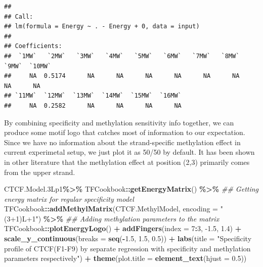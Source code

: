 \documentclass[
]{article}
\newenvironment{Shaded}{\begin{snugshade}}{\end{snugshade}}
\newcommand{\CommentTok}[1]{\textcolor[rgb]{0.56,0.35,0.01}{\textit{#1}}}
\newcommand{\DataTypeTok}[1]{\textcolor[rgb]{0.13,0.29,0.53}{#1}}
\newcommand{\DecValTok}[1]{\textcolor[rgb]{0.00,0.00,0.81}{#1}}
\newcommand{\FloatTok}[1]{\textcolor[rgb]{0.00,0.00,0.81}{#1}}
\newcommand{\KeywordTok}[1]{\textcolor[rgb]{0.13,0.29,0.53}{\textbf{#1}}}
\newcommand{\NormalTok}[1]{#1}
\newcommand{\OperatorTok}[1]{\textcolor[rgb]{0.81,0.36,0.00}{\textbf{#1}}}
\newcommand{\StringTok}[1]{\textcolor[rgb]{0.31,0.60,0.02}{#1}}
\begin{document}
\begin{verbatim}
## 
## Call:
## lm(formula = Energy ~ . - Energy + 0, data = input)
## 
## Coefficients:
##  `1MW`   `2MW`   `3MW`   `4MW`   `5MW`   `6MW`   `7MW`   `8MW`   `9MW`  `10MW`  
##     NA  0.5174      NA      NA      NA      NA      NA      NA      NA      NA  
## `11MW`  `12MW`  `13MW`  `14MW`  `15MW`  `16MW`  
##     NA  0.2582      NA      NA      NA      NA
\end{verbatim}

By combining specificity and methylation sensitivity info together, we
can produce some motif logo that catches most of information to our
expectation. Since we have no information about the strand-specific
methylation effect in current experimetal setup, we just plot it as
50/50 by default. It has been shown in other literature that the
methylation effect at position (2,3) primarily comes from the upper
strand.

\begin{Shaded}
\begin{Highlighting}[]
\NormalTok{CTCF.Model}\FloatTok{.3}\NormalTok{Lp1}\OperatorTok{\%\textgreater{}\%}
\StringTok{  }\NormalTok{TFCookbook}\OperatorTok{::}\KeywordTok{getEnergyMatrix}\NormalTok{() }\OperatorTok{\%\textgreater{}\%}\StringTok{  }\CommentTok{\#\# Getting energy matrix for regular specificity model}
\StringTok{  }\NormalTok{TFCookbook}\OperatorTok{::}\KeywordTok{addMethylMatrix}\NormalTok{(CTCF.MethylModel, }\DataTypeTok{encoding =} \StringTok{"(3+1)L+1"}\NormalTok{) }\OperatorTok{\%\textgreater{}\%}\StringTok{ }\CommentTok{\#\# Adding methylation parameters to the matrix}
\StringTok{  }\NormalTok{TFCookbook}\OperatorTok{::}\KeywordTok{plotEnergyLogo}\NormalTok{() }\OperatorTok{+}
\StringTok{  }\KeywordTok{addFingers}\NormalTok{(}\DataTypeTok{index =} \DecValTok{7}\OperatorTok{:}\DecValTok{3}\NormalTok{, }\FloatTok{{-}1.5}\NormalTok{, }\FloatTok{1.4}\NormalTok{) }\OperatorTok{+}
\StringTok{  }\KeywordTok{scale\_y\_continuous}\NormalTok{(}\DataTypeTok{breaks =} \KeywordTok{seq}\NormalTok{(}\OperatorTok{{-}}\FloatTok{1.5}\NormalTok{, }\FloatTok{1.5}\NormalTok{, }\FloatTok{0.5}\NormalTok{)) }\OperatorTok{+}
\StringTok{  }\KeywordTok{labs}\NormalTok{(}\DataTypeTok{title =} \StringTok{"Specificity profile of CTCF(F1{-}F9)}
\StringTok{       by separate regression with specificity and methylation parameters respectively"}\NormalTok{) }\OperatorTok{+}
\StringTok{  }\KeywordTok{theme}\NormalTok{(}\DataTypeTok{plot.title =} \KeywordTok{element\_text}\NormalTok{(}\DataTypeTok{hjust =} \FloatTok{0.5}\NormalTok{))}
\end{Highlighting}
\end{Shaded}
\end{document}

